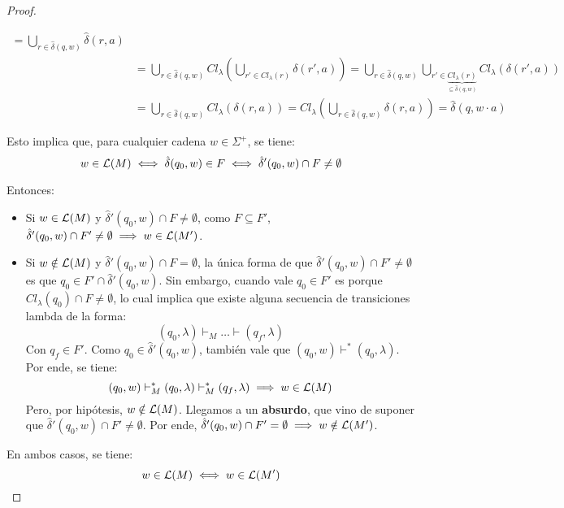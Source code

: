 \begin{proof}
\begin{itemize}
$$\begin{aligned}
                      = \bigcup_{r \in \hat \delta(q, w)} \hat \delta(r, a)                                                                                                                                                                                              \\
                       & = \bigcup_{r \in \hat \delta(q, w)} Cl_\lambda\left(\bigcup_{r' \in Cl_\lambda(r)} \delta(r', a)\right) = \bigcup_{r \in \hat \delta(q, w)} \bigcup_{r' \in \underbrace{Cl_\lambda(r)}_{\subseteq \hat \delta(q, w)}} Cl_\lambda(\delta(r', a)) \\
                       & = \bigcup_{r \in \hat \delta(q, w)} Cl_\lambda(\delta(r, a)) = Cl_\lambda\left(\bigcup_{r \in \hat \delta(q, w)} \delta(r, a)\right) = \hat \delta (q, w \cdot a)
                  \end{aligned}
              $$
    \end{itemize}

    Esto implica que, para cualquier cadena $w \in \Sigma^+$, se tiene:
    $$w \in \mathcal{L}(M) \iff \hat \delta(q_0, w) \in F \iff \hat \delta'(q_0, w) \cap F \neq \emptyset$$

    Entonces:
    \begin{itemize}
        \item Si $w \in \mathcal{L}(M)$ y $\hat \delta'(q_0, w) \cap F \neq \emptyset$, como $F \subseteq F'$, $\hat \delta'(q_0, w) \cap F' \neq \emptyset \implies w \in \mathcal{L}(M')$.
        \item Si $w \notin \mathcal{L}(M)$ y $\hat \delta'(q_0, w) \cap F = \emptyset$, la única forma de que $\hat \delta'(q_0, w) \cap F' \neq \emptyset$ es que $q_0 \in F' \cap \hat \delta'(q_0, w)$. Sin embargo, cuando vale $q_0 \in F'$ es porque $Cl_\lambda(q_0) \cap F \neq \emptyset$, lo cual implica que existe alguna secuencia de transiciones lambda de la forma:
              $$(q_0, \lambda) \vdash_M \dots \vdash (q_f, \lambda)$$
              Con $q_f \in F'$. Como $q_0 \in \hat \delta'(q_0, w)$, también vale que $(q_0, w) \vdash^* (q_0, \lambda)$. Por ende, se tiene:
              $$(q_0, w) \vdash_M^* (q_0, \lambda) \vdash_M^* (q_f, \lambda) \implies w \in \mathcal{L}(M)$$
              Pero, por hipótesis, $w \notin \mathcal{L}(M)$. Llegamos a un \textbf{absurdo}, que vino de suponer que $\hat \delta'(q_0, w) \cap F' \neq \emptyset$. Por ende, $\hat \delta'(q_0, w) \cap F' = \emptyset \implies w \notin \mathcal{L}(M')$.
    \end{itemize}

    En ambos casos, se tiene:
    $$w \in \mathcal{L}(M) \iff w \in \mathcal{L}(M')$$
\end{proof}

